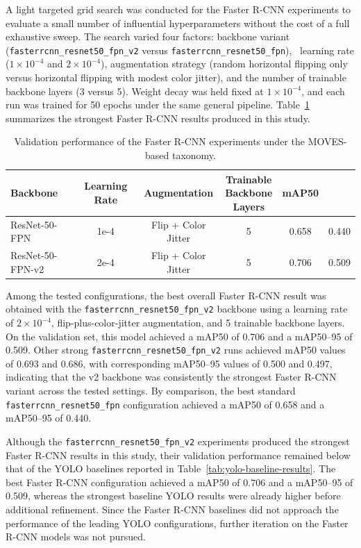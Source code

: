 A light targeted grid search was conducted for the Faster R-CNN experiments to 
evaluate a small number of influential hyperparameters without the cost of a 
full exhaustive sweep. The search varied four factors: backbone variant 
(\verb|fasterrcnn_resnet50_fpn_v2| versus \verb|fasterrcnn_resnet50_fpn|), \
learning rate ($1\times10^{-4}$ and $2\times10^{-4}$), augmentation strategy 
(random horizontal flipping only versus horizontal flipping with modest color 
jitter), and the number of trainable backbone layers (3 versus 5). Weight decay
was held fixed at $1\times10^{-4}$, and each run was trained for 50 epochs under
the same general pipeline. Table~\ref{tab:faster-rcnn-results} summarizes the 
strongest Faster R-CNN results produced in this study.

\begin{table}[!htbp]
    \centering
    \caption{Validation performance of the Faster R-CNN experiments under the MOVES-based taxonomy.}
    \label{tab:faster-rcnn-results}
    \begin{tabular}{l c c c c c}
        \toprule
        Backbone & Learning Rate & Augmentation & \shortstack{Trainable\\Backbone\\Layers} & mAP50 & \shortstack{mAP50--95} \\
        \midrule
        ResNet-50-FPN    & 1e-4 & Flip + Color Jitter & 5 & 0.658 & 0.440 \\
        ResNet-50-FPN-v2 & 2e-4 & Flip + Color Jitter & 5 & 0.706 & 0.509 \\
        \bottomrule
    \end{tabular}
\end{table}
\FloatBarrier

Among the tested configurations, the best overall Faster R-CNN result was obtained
with the \verb|fasterrcnn_resnet50_fpn_v2| backbone using a learning rate of $2\times10^{-4}$,
flip-plus-color-jitter augmentation, and 5 trainable backbone layers. On the 
validation set, this model achieved a mAP50 of 0.706 and a mAP50--95 of 0.509. 
Other strong \verb|fasterrcnn_resnet50_fpn_v2| runs achieved mAP50 values of 0.693 and 0.686,
with corresponding mAP50--95 values of 0.500 and 0.497, indicating that the v2 
backbone was consistently the strongest 
Faster R-CNN variant across the tested settings. By comparison, the best standard 
\verb|fasterrcnn_resnet50_fpn| configuration achieved a mAP50 of 0.658 and a mAP50--95 
of 0.440. 

Although the \verb|fasterrcnn_resnet50_fpn_v2| experiments produced the strongest 
Faster R-CNN results in this study, their validation performance remained below that 
of the YOLO baselines reported in Table~\ref{tab:yolo-baseline-results}. 
The best Faster R-CNN configuration achieved a mAP50 of 0.706 and a mAP50--95 of 0.509, 
whereas the strongest baseline YOLO results were already higher before additional 
refinement. Since the Faster R-CNN baselines did not approach the performance of the 
leading YOLO configurations, further iteration on the Faster R-CNN models was not
pursued.

